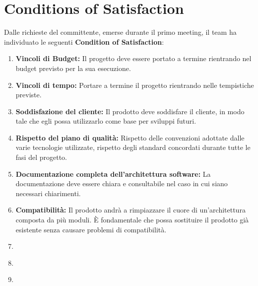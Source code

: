 \documentclass[12pt, a4paper]{article}
\begin{document}
\section{Conditions of Satisfaction}

Dalle richieste del committente, emerse durante il primo meeting, il team ha individuato le seguenti \textbf{Condition of 
Satisfaction}:

\begin{enumerate}
    \item \textbf{Vincoli di Budget:} Il progetto deve essere portato a termine rientrando nel budget previsto per la 
    sua esecuzione.
    \item \textbf{Vincoli di tempo:} Portare a termine il progetto rientrando nelle tempistiche previste.
    \item \textbf{Soddisfazione del cliente:} Il prodotto deve soddisfare il cliente, in modo tale che egli possa 
    utilizzarlo come base per sviluppi futuri.
    \item \textbf{Rispetto del piano di qualità:} Rispetto delle convenzioni adottate dalle varie tecnologie utilizzate,
    rispetto degli standard concordati durante tutte le fasi del progetto.
    \item \textbf{Documentazione completa dell'architettura software:} La documentazione deve essere chiara e consultabile
    nel caso in cui siano necessari chiarimenti.
    \item \textbf{Compatibilità:} Il prodotto andrà a rimpiazzare il cuore di un'architettura composta da più moduli.
    È fondamentale che possa sostituire il prodotto già esistente senza causare problemi di compatibilità.
    \item \textbf{}
    \item \textbf{}
    \item \textbf{}
\end{enumerate}
\end{document}
